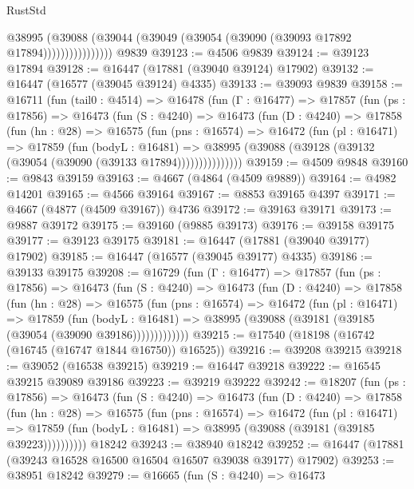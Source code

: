 \begin{lexlean}{RustStd}
\begin{coremodule}
                      @38995
                        (@39088
                          (@39044 (@39049 (@39054 (@39090 (@39093 @17892 @17894))))))))))))))))
    @9839
@39123 := @4506 @9839
@39124 := @39123 @17894
@39128 := @16447 (@17881 (@39040 @39124) @17902)
@39132 := @16447 (@16577 (@39045 @39124) @4335)
@39133 := @39093 @9839
@39158 := @16711
    (fun (tail0 : @4514) =>
    @16478
      (fun (Γ : @16477) =>
      @17857
        (fun (ps : @17856) =>
        @16473
          (fun (S : @4240) =>
          @16473
            (fun (D : @4240) =>
            @17858
              (fun (hn : @28) =>
              @16575
                (fun (pns : @16574) =>
                @16472
                  (fun (pl : @16471) =>
                  @17859
                    (fun (bodyL : @16481) =>
                    @38995 (@39088 (@39128 (@39132 (@39054 (@39090 (@39133 @17894)))))))))))))))
@39159 := @4509 @9848
@39160 := @9843 @39159
@39163 := @4667 (@4864 (@4509 @9889))
@39164 := @4982 @14201
@39165 := @4566 @39164
@39167 := @8853 @39165 @4397
@39171 := @4667 (@4877 (@4509 @39167)) @4736
@39172 := @39163 @39171
@39173 := @9887 @39172
@39175 := @39160 (@9885 @39173)
@39176 := @39158 @39175
@39177 := @39123 @39175
@39181 := @16447 (@17881 (@39040 @39177) @17902)
@39185 := @16447 (@16577 (@39045 @39177) @4335)
@39186 := @39133 @39175
@39208 := @16729
    (fun (Γ : @16477) =>
    @17857
      (fun (ps : @17856) =>
      @16473
        (fun (S : @4240) =>
        @16473
          (fun (D : @4240) =>
          @17858
            (fun (hn : @28) =>
            @16575
              (fun (pns : @16574) =>
              @16472
                (fun (pl : @16471) =>
                @17859
                  (fun (bodyL : @16481) =>
                  @38995 (@39088 (@39181 (@39185 (@39054 (@39090 @39186)))))))))))))
@39215 := @17540 (@18198 (@16742 (@16745 (@16747 @1844 @16750)) @16525))
@39216 := @39208 @39215
@39218 := @39052 (@16538 @39215)
@39219 := @16447 @39218
@39222 := @16545 @39215 @39089 @39186
@39223 := @39219 @39222
@39242 := @18207
    (fun (ps : @17856) =>
    @16473
      (fun (S : @4240) =>
      @16473
        (fun (D : @4240) =>
        @17858
          (fun (hn : @28) =>
          @16575
            (fun (pns : @16574) =>
            @16472
              (fun (pl : @16471) =>
              @17859 (fun (bodyL : @16481) => @38995 (@39088 (@39181 (@39185 @39223))))))))))
    @18242
@39243 := @38940 @18242
@39252 := @16447 (@17881 (@39243 @16528 @16500 @16504 @16507 @39038 @39177) @17902)
@39253 := @38951 @18242
@39279 := @16665
    (fun (S : @4240) =>
    @16473

\end{coremodule}
\end{lexlean}

